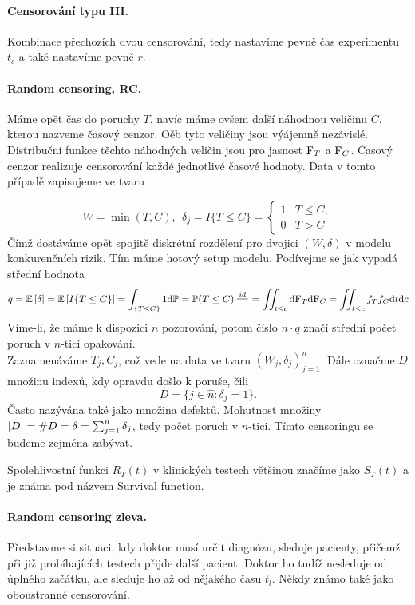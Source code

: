 \paragraph{Censorování typu III.}
Kombinace přechozích dvou censorování, tedy nastavíme pevně čas experimentu $t_c$ a také nastavíme pevně $r$.
\paragraph{Random censoring, RC.}
Máme opět čas do poruchy $T$, navíc máme ovšem další náhodnou veličinu $C$, kterou nazveme časový cenzor. Oěb tyto veličiny jsou výájemně nezávislé. Distribuční funkce těchto náhodných veličin jsou pro jasnost $\mathrm{F}_T$ a $\mathrm{F}_C$. Časový cenzor realizuje censorování každé jednotlivé časové hodnoty. Data v tomto případě zapisujeme ve tvaru

$$W = \min(T,C), ~~\delta_j = I\lbrace T \leq C \rbrace = \begin{cases}
	1& T\leq C,\\0& T > C 
\end{cases}
$$
Čímž dostáváme opět spojitě diskrétní rozdělení pro dvojici
$(W,\delta)$ v modelu konkurenčních rizik. Tím máme hotový setup modelu. Podívejme se jak vypadá střední hodnota
$$q = \EE{\delta} =  \EE{I\lbrace T \leq C \rbrace} = \int_{\lbrace T \leq C \rbrace}1\d\PP = \PP(T\leq C)\equal{id} = \iint_{t\leq c}\d\FF_T\d\FF_C = \iint_{t\leq c}f_Tf_C  \d t \d c$$
Víme-li, že máme k dispozici $n$ pozorování, potom číslo $n\cdot q$ značí střední počet poruch v $n$-tici opakování. \\
Zaznamenáváme $T_j, C_j$, což vede na data ve tvaru $(W_j,\delta_j)_{j=1}^n$. Dále označme $D$ množinu indexů, kdy opravdu došlo k poruše, čili $$D = \lbrace j\in \hat{n}: \delta_j =1 \rbrace .$$ Často nazývána také jako množina defektů. Mohutnost množiny $\left|D\right| = \# D = \delta = \sum_{j=1}^n\delta_j$, tedy počet poruch v $n$-tici. Tímto censoringu se budeme zejména zabývat.
\begin{remark}
	Spolehlivostní funkci $R_T(t)$ v klinických testech většinou značíme jako $S_T(t)$ a je známa pod názvem Survival function. 	
\end{remark} 
\paragraph{Random censoring zleva.}
Představme si situaci, kdy doktor musí určit diagnózu, sleduje pacienty, přičemž při již probíhajících testech přijde další pacient. Doktor ho tudíž nesleduje od úplného začátku, ale sleduje ho až od nějakého času $t_{l}$. Někdy známo také jako oboustranné censorování.
